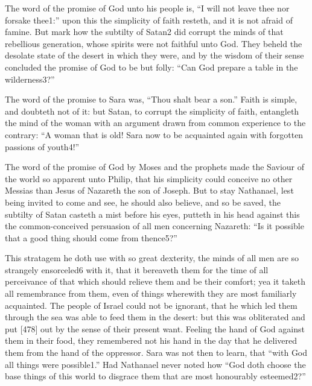 The word of the promise of God unto his people is, “I will not leave thee nor forsake thee1:” upon this the simplicity of faith resteth, and it is not afraid of famine. But mark how the subtilty of Satan2 did corrupt the minds of that rebellious generation, whose spirits were not faithful unto God. They beheld the desolate state of the desert in which they were, and by the wisdom of their sense concluded the promise of God to be but folly: “Can God prepare a table in the wilderness3?”

The word of the promise to Sara was, “Thou shalt bear a son.” Faith is simple, and doubteth not of it: but Satan, to corrupt the simplicity of faith, entangleth the mind of the woman with an argument drawn from common experience to the contrary: “A woman that is old! Sara now to be acquainted again with forgotten passions of youth4!”

The word of the promise of God by Moses and the prophets made the Saviour of the world so apparent unto Philip, that his simplicity could conceive no other Messias than Jesus of Nazareth the son of Joseph. But to stay Nathanael, lest being invited to come and see, he should also believe, and so be saved, the subtilty of Satan casteth a mist before his eyes, putteth in his head against this the common-conceived persuasion of all men concerning Nazareth: “Is it possible that a good thing should come from thence5?”

This stratagem he doth use with so great dexterity, the minds of all men are so strangely ensorceled6 with it, that it bereaveth them for the time of all perceivance of that which should relieve them and be their comfort; yea it taketh all remembrance from them, even of things wherewith they are most familiarly acquainted. The people of Israel could not be ignorant, that he which led them through the sea was able to feed them in the desert: but this was obliterated and put [478] out by the sense of their present want. Feeling the hand of God against them in their food, they remembered not his hand in the day that he delivered them from the hand of the oppressor. Sara was not then to learn, that “with God all things were possible1.” Had Nathanael never noted how “God doth choose the base things of this world to disgrace them that are most honourably esteemed2?”

